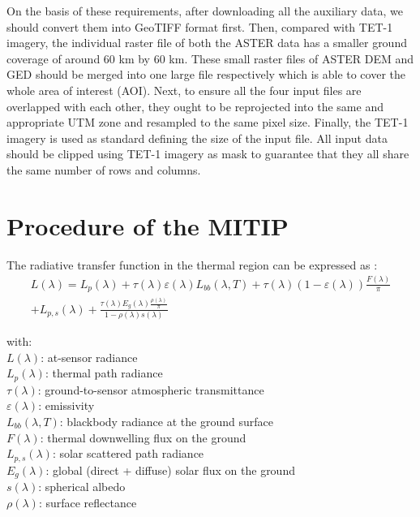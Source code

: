 \noindent On the basis of these requirements, after downloading all the auxiliary data, we should convert them into GeoTIFF format first. Then, compared with TET-1 imagery, the individual raster file of both the ASTER data has a smaller ground coverage of around 60 km by 60 km. These small raster files of ASTER DEM and GED should be merged into one large file respectively which is able to cover the whole area of interest (AOI). Next, to ensure all the four input files are overlapped with each other, they ought to be reprojected into the same and appropriate UTM zone and resampled to the same pixel size. Finally, the TET-1 imagery is used as standard defining the size of the input file. All input data should be clipped using TET-1 imagery as mask to guarantee that they all share the same number of rows and columns.\\ 


\section{Procedure of the MITIP}

The radiative transfer function in the thermal region can be expressed as \parencite{Reference304, Reference305}:
\begin{equation}
\begin{aligned}
\label{eq301}
L(\lambda) = L_p(\lambda) + \tau (\lambda) \varepsilon (\lambda) L_{bb}(\lambda, T) + \tau (\lambda) (1 - \varepsilon (\lambda)) \frac{F(\lambda)}{\pi}\\
+L_{p,s}(\lambda) + \frac{\tau (\lambda) E_g(\lambda) \frac{\rho (\lambda)}{\pi}}{1 - \rho (\lambda) s(\lambda)}
\end{aligned}
\end{equation}

\noindent with:\\
\indent $L(\lambda)$: at-sensor radiance\\
\indent $L_p(\lambda)$: thermal path radiance\\
\indent $\tau (\lambda)$: ground-to-sensor atmospheric transmittance\\
\indent $\varepsilon (\lambda)$: emissivity\\
\indent $L_{bb}(\lambda, T)$: blackbody radiance at the ground surface\\
\indent $F(\lambda)$: thermal downwelling flux on the ground\\
\indent $L_{p, s}(\lambda)$: solar scattered path radiance\\
\indent $E_g(\lambda)$: global (direct + diffuse) solar flux on the ground\\
\indent $s(\lambda)$: spherical albedo\\
\indent $\rho (\lambda)$: surface reflectance\\


